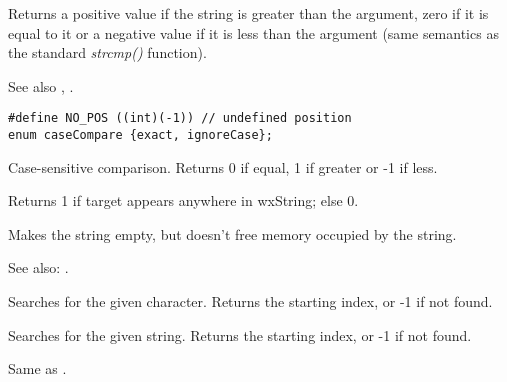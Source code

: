 Returns a positive value if the string is greater than the argument, zero if
it is equal to it or a negative value if it is less than the argument (same semantics
as the standard {\it strcmp()} function).

See also , .

\label{wxstringcompareto}

\begin{verbatim}
#define NO_POS ((int)(-1)) // undefined position
enum caseCompare {exact, ignoreCase};
\end{verbatim}


Case-sensitive comparison. Returns 0 if equal, 1 if greater or -1 if less.

\label{wxstringcontains}


Returns 1 if target appears anywhere in wxString; else 0.

\label{wxstringempty}


Makes the string empty, but doesn't free memory occupied by the string.

See also: .

\label{wxstringfind}


Searches for the given character. Returns the starting index, or -1 if not found.


Searches for the given string. Returns the starting index, or -1 if not found.

\label{wxstringfirst}




Same as .

\label{wxstringfnstr}

